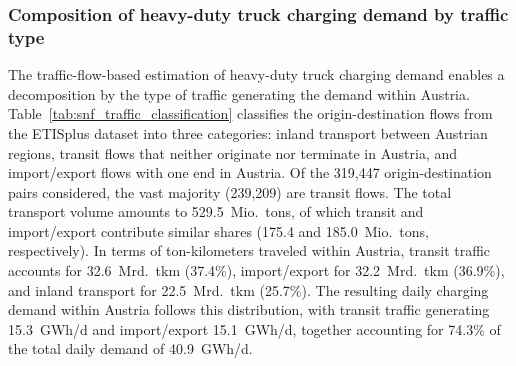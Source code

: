 \subsubsection{Composition of heavy-duty truck charging demand by traffic type}

The traffic-flow-based estimation of heavy-duty truck charging demand enables a decomposition by the type of traffic generating the demand within Austria. Table~\ref{tab:snf_traffic_classification} classifies the origin-destination flows from the ETISplus dataset into three categories: inland transport between Austrian regions, transit flows that neither originate nor terminate in Austria, and import/export flows with one end in Austria. Of the 319,447 origin-destination pairs considered, the vast majority (239,209) are transit flows. The total transport volume amounts to 529.5~Mio.~tons, of which transit and import/export contribute similar shares (175.4 and 185.0~Mio.~tons, respectively). In terms of ton-kilometers traveled within Austria, transit traffic accounts for 32.6~Mrd.~tkm (37.4\%), import/export for 32.2~Mrd.~tkm (36.9\%), and inland transport for 22.5~Mrd.~tkm (25.7\%). The resulting daily charging demand within Austria follows this distribution, with transit traffic generating 15.3~GWh/d and import/export 15.1~GWh/d, together accounting for 74.3\% of the total daily demand of 40.9~GWh/d.

\begin{table}[htbp]
\centering
\caption{Classification of heavy-duty truck charging demand in Austria by traffic type, based on ETISplus 2030 transport flow projections. AT~tkm refers to ton-kilometers traveled within Austria. Daily demand represents electricity required for charging within Austria.}
\label{tab:snf_traffic_classification}
\end{table}

